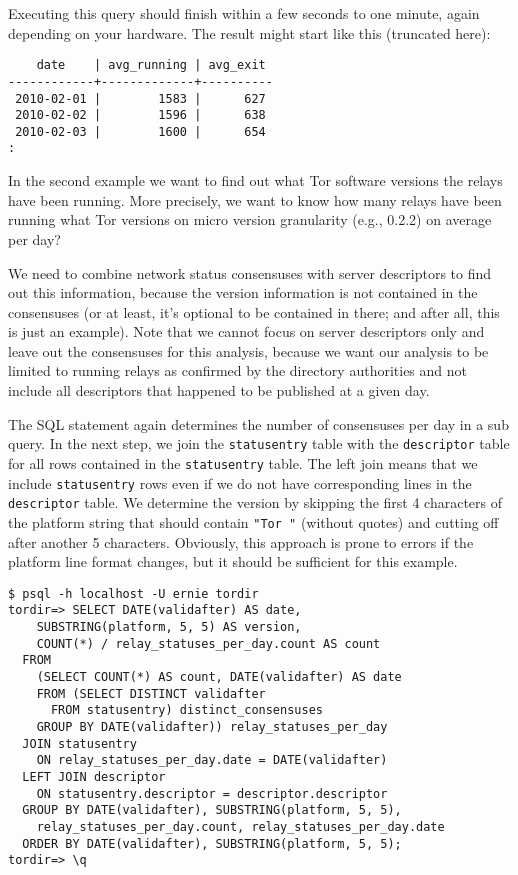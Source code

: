 \documentclass{article}
\begin{document}
Executing this query should finish within a few seconds to one minute,
again depending on your hardware.
The result might start like this (truncated here):

\begin{verbatim}
    date    | avg_running | avg_exit
------------+-------------+----------
 2010-02-01 |        1583 |      627
 2010-02-02 |        1596 |      638
 2010-02-03 |        1600 |      654
:
\end{verbatim}

In the second example we want to find out what Tor software versions the
relays have been running.
More precisely, we want to know how many relays have been running what Tor
versions on micro version granularity (e.g., 0.2.2) on average per day?

We need to combine network status consensuses with server descriptors to
find out this information, because the version information is not
contained in the consensuses (or at least, it's optional to be contained
in there; and after all, this is just an example).
Note that we cannot focus on server descriptors only and leave out the
consensuses for this analysis, because we want our analysis to be limited
to running relays as confirmed by the directory authorities and not
include all descriptors that happened to be published at a given day.

The SQL statement again determines the number of consensuses per day in a
sub query.
In the next step, we join the \verb+statusentry+ table with the
\verb+descriptor+ table for all rows contained in the \verb+statusentry+
table.
The left join means that we include \verb+statusentry+ rows even if we do
not have corresponding lines in the \verb+descriptor+ table.
We determine the version by skipping the first 4 characters of the platform
string that should contain \verb+"Tor "+ (without quotes) and cutting off
after another 5 characters.
Obviously, this approach is prone to errors if the platform line format
changes, but it should be sufficient for this example.

\begin{verbatim}
$ psql -h localhost -U ernie tordir
tordir=> SELECT DATE(validafter) AS date,
    SUBSTRING(platform, 5, 5) AS version,
    COUNT(*) / relay_statuses_per_day.count AS count
  FROM
    (SELECT COUNT(*) AS count, DATE(validafter) AS date
    FROM (SELECT DISTINCT validafter
      FROM statusentry) distinct_consensuses
    GROUP BY DATE(validafter)) relay_statuses_per_day
  JOIN statusentry
    ON relay_statuses_per_day.date = DATE(validafter)
  LEFT JOIN descriptor
    ON statusentry.descriptor = descriptor.descriptor
  GROUP BY DATE(validafter), SUBSTRING(platform, 5, 5),
    relay_statuses_per_day.count, relay_statuses_per_day.date
  ORDER BY DATE(validafter), SUBSTRING(platform, 5, 5);
tordir=> \q
\end{verbatim}
\end{document}
